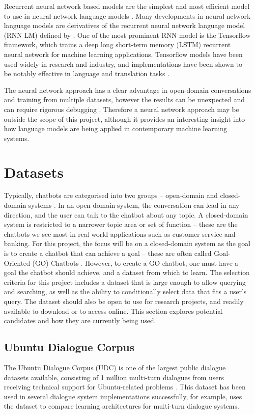 Recurrent neural network based models are the simplest and most efficient model to use in neural network language models \cite{mikolov2010recurrent}. Many developments in neural network language models are derivatives of the recurrent neural network language model (RNN LM) defined by \citet{mikolov2010recurrent}. One of the most prominent RNN model is the Tensorflow framework, which trains a deep long short-term memory (LSTM) recurrent neural network \cite{abadi2016tensorflow} for machine learning applications. Tensorflow models have been used widely in research and industry, and implementations have been shown to be notably effective in language and translation tasks \cite{wu2016google}.

The neural network approach has a clear advantage in open-domain conversations and training from multiple datasets, however the results can be unexpected and can require rigorous debugging \cite{pascanu2013difficulty}. Therefore a neural network approach may be outside the scope of this project, although it provides an interesting insight into how language models are being applied in contemporary machine learning systems. 

\newpage
\section{Datasets}
Typically, chatbots are categorised into two groups -- open-domain and closed-domain systems \cite{ilievski2018building}. In an open-domain system, the conversation can lead in any direction, and the user can talk to the chatbot about any topic. A closed-domain system is restricted to a narrower topic area or set of function -- these are the chatbots we see most in real-world applications such as customer service and banking. For this project, the focus will be on a closed-domain system as the goal is to create a chatbot that can achieve a goal -- these are often called Goal-Oriented (GO) Chatbots \cite{ilievski2018building}. However, to create a GO chatbot, one must have a goal the chatbot should achieve, and a dataset from which to learn. The selection criteria for this project includes a dataset that is large enough to allow querying and searching, as well as the ability to conditionally select data that fits a user's query. The dataset should also be open to use for research projects, and readily available to download or to access online. This section explores potential candidates and how they are currently being used.


\subsection{Ubuntu Dialogue Corpus}
The Ubuntu Dialogue Corpus (UDC) is one of the largest public dialogue datasets available, consisting of 1 million multi-turn dialogues from users receiving technical support for Ubuntu-related problems \cite{lowe2015ubuntu}. This dataset has been used in several dialogue system implementations successfully, for example, \citet{lowe2015ubuntu} uses the dataset to compare learning architectures for multi-turn dialogue systems. 

